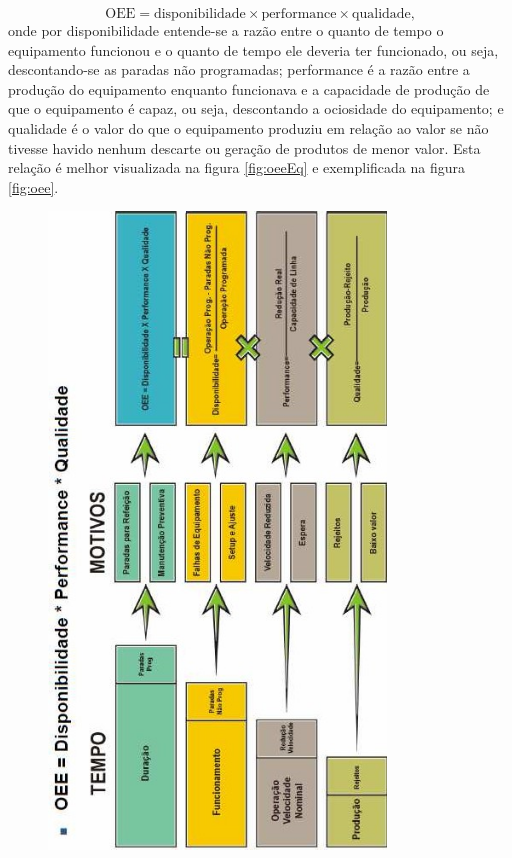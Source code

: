 \begin{description}
\begin{equation}
	\text{OEE} = \text{disponibilidade}\times\text{performance}\times\text{qualidade,}
\end{equation}
onde por disponibilidade entende-se a razão entre o quanto de tempo o equipamento funcionou e o quanto de tempo ele deveria ter funcionado, ou seja, descontando-se as paradas não programadas; performance é a razão entre a produção do equipamento enquanto funcionava e a capacidade de produção de que o equipamento é capaz, ou seja, descontando a ociosidade do equipamento; e qualidade é o valor do que o equipamento produziu em relação ao valor se não tivesse havido nenhum descarte ou geração de produtos de menor valor. Esta relação é melhor visualizada na figura \ref{fig:oeeEq} e exemplificada na figura \ref{fig:oee}.

\begin{figure}[hbt]
	\begin{center}
		\includegraphics[angle=-90,width=0.8\textwidth]{figuras/oee3}

\end{center}
\end{figure}
\end{description}
